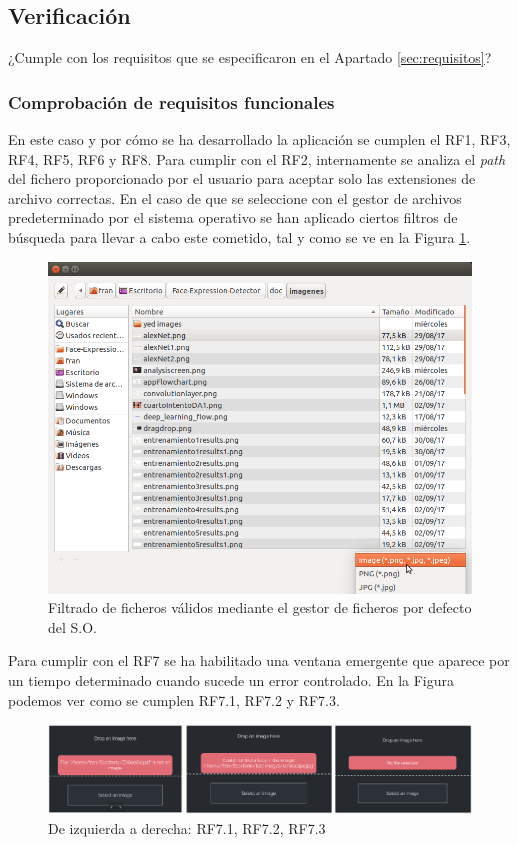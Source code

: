 \documentclass[a4paper,11pt]{book}
\begin{document}
\subsection{Verificación}\label{subsec:verificacion}
¿Cumple con los requisitos que se especificaron en el Apartado \ref{sec:requisitos}?\\
\subsubsection{Comprobación de requisitos funcionales}
En este caso y por cómo se ha desarrollado la aplicación se cumplen el RF1, RF3, RF4, RF5, RF6 y RF8. Para cumplir con el RF2, internamente se analiza el \textit{path} del fichero proporcionado por el usuario para aceptar solo las extensiones de archivo correctas. En el caso de que se seleccione con el gestor de archivos predeterminado por el sistema operativo se han aplicado ciertos filtros de búsqueda para llevar a cabo este cometido, tal y como se ve en la Figura \ref{fig:filters}.\\
\begin{figure}[h]
\centering
\includegraphics[width=0.7\linewidth]{imagenes/filters}
\caption[Filtros]{Filtrado de ficheros válidos mediante el gestor de ficheros por defecto del S.O.}
\label{fig:filters}
\end{figure}

Para cumplir con el RF7 se ha habilitado una ventana emergente que aparece por un tiempo determinado cuando sucede un error controlado. En la Figura podemos ver como se cumplen RF7.1, RF7.2 y RF7.3.\\

\begin{figure}[h]
\centering
\includegraphics[width=1.0\linewidth]{imagenes/RF7}
\caption[RF7]{De izquierda a derecha: RF7.1, RF7.2, RF7.3}
\label{fig:RF7}
\end{figure}
\end{document}
